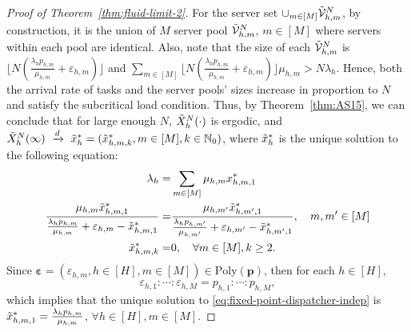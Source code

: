\documentclass[11pt, reqno]{article}
\numberwithin{equation}{section}
\numberwithin{theorem}{section}
\newcommand{\dto}{\ensuremath{\ \xrightarrow{d} \ }}  %
\newcommand{\N}{\mathbb{N}}                 %
\begin{document}
\begin{proof}[Proof of Theorem~\ref{thm:fluid-limit-2}]
For the server set $\cup_{m\in[M]}\Tilde{\mathcal{V}}^N_{h,m}$, by construction, it is the union of $M$ server pool $\Tilde{\mathcal{V}}^N_{h,m}$, $m\in[M]$ where servers within each pool are identical. 
Also, note that the size of each $\Tilde{\mathcal{V}}^N_{h,m}$ is $\lfloor N(\frac{\lambda_hp_{h,m}}{\mu_{h,m}}+\varepsilon_{h,m})\rfloor$ and $\sum_{m\in[M]}\lfloor N(\frac{\lambda_hp_{h,m}}{\mu_{h,m}}+\varepsilon_{h,m})\rfloor\mu_{h,m}>N\lambda_h$. Hence, both the arrival rate of tasks and the server pools' sizes increase in proportion to $N$ and satisfy the subcritical load condition. 
Thus, by Theorem~\ref{thm:AS15}, we can conclude that for large enough $N$, $\Tilde{X}^N_h(\cdot)$ is ergodic, and $\Tilde{X}^N_h(\infty)\dto \Tilde{x}^*_h=(\Tilde{x}^*_{h,m,k},m\in[M],k\in \N_0)$, where $\Tilde{x}^*_h$ is the unique solution to the following equation: 
\begin{equation}\label{eq:fixed-point-dispatcher-indep}
    \begin{split}
        \lambda_h=&\sum_{m\in [M]}\mu_{h,m}x^*_{h,m,1}\\
        \frac{\mu_{h,m}\Tilde{x}^*_{h,m,1}}{\frac{\lambda_hp_{h,m}}{\mu_{h,m}}+\varepsilon_{h,m}-\Tilde{x}^*_{h,m,1}}=&\frac{\mu_{h,m'}\Tilde{x}^*_{h,m',1}}{\frac{\lambda_hp_{h,m'}}{\mu_{h,m'}}+\varepsilon_{h,m'}-\Tilde{x}^*_{h,m',1}},\quad m,m'\in[M]\\
        \Tilde{x}^*_{h,m,k}=&0,\quad \forall m\in[M],k\geq 2.
    \end{split}
\end{equation}
Since $\boldsymbol\varepsilon=(\varepsilon_{h,m},h\in[H],m\in[M])\in \mathrm{Poly}(\mathbf{p})$, then for each $h\in[H]$, $$\varepsilon_{h,1}:\cdots:\varepsilon_{h,M}  =  p_{h,1}:\cdots:p_{h,M},$$ which implies that the unique solution to \eqref{eq:fixed-point-dispatcher-indep} is $\Tilde{x}^*_{h,m,1}=\frac{\lambda_hp_{h,m}}{\mu_{h,m}}$, $\forall h\in[H], m\in[M]$.
\end{proof}
\end{document}
